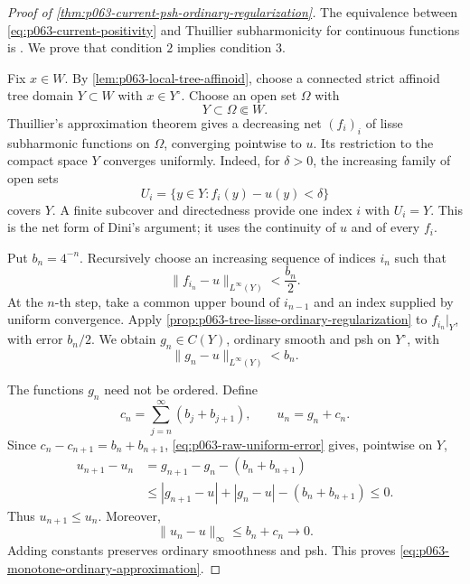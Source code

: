 \begin{proof}[Proof of
\cref{thm:p063-current-psh-ordinary-regularization}]
The equivalence between
\eqref{eq:p063-current-positivity} and Thuillier subharmonicity for
continuous functions is \cite[Corollary~4.8]{Wanner19}.
We prove that condition \(2\) implies condition \(3\).

Fix \(x\in W\).  By \cref{lem:p063-local-tree-affinoid}, choose a connected
strict affinoid tree domain \(Y\subset W\) with \(x\in Y^\circ\).  Choose
an open set \(\Omega\) with
\[
                         Y\subset\Omega\Subset W.
\]
Thuillier's approximation theorem
\cite[Theorem~3.4.2]{Thu05} gives a decreasing net
\((f_i)_i\) of lisse subharmonic functions on \(\Omega\), converging
pointwise to \(u\).  Its restriction to the compact space \(Y\) converges
uniformly.  Indeed, for \(\delta>0\), the increasing family of open sets
\[
                         U_i=\{y\in Y:f_i(y)-u(y)<\delta\}
\]
covers \(Y\).  A finite subcover and directedness provide one index \(i\)
with \(U_i=Y\).  This is the net form of Dini's argument; it uses the
continuity of \(u\) and of every \(f_i\).

Put \(b_n=4^{-n}\).  Recursively choose an increasing sequence of indices
\(i_n\) such that
\[
                         \lVert f_{i_n}-u\rVert_{L^\infty(Y)}
                         <\frac{b_n}{2}.
\]
At the \(n\)-th step, take a common upper bound of \(i_{n-1}\) and an
index supplied by uniform convergence.  Apply
\cref{prop:p063-tree-lisse-ordinary-regularization} to
\(f_{i_n}|_Y\), with error \(b_n/2\).  We obtain \(g_n\in C(Y)\), ordinary
smooth and psh on \(Y^\circ\), with
\begin{equation}
\label{eq:p063-raw-uniform-error}
                         \lVert g_n-u\rVert_{L^\infty(Y)}<b_n.
\end{equation}

The functions \(g_n\) need not be ordered.  Define
\begin{equation}
\label{eq:p063-tail-shift}
                         c_n
   =\sum_{j=n}^{\infty}(b_j+b_{j+1}),
   \qquad
                         u_n=g_n+c_n.
\end{equation}
Since \(c_n-c_{n+1}=b_n+b_{n+1}\),
\eqref{eq:p063-raw-uniform-error} gives, pointwise on \(Y\),
\[
 \begin{aligned}
 u_{n+1}-u_n
   &=
 g_{n+1}-g_n-(b_n+b_{n+1})\\
   &\leq
 |g_{n+1}-u|+|g_n-u|-(b_n+b_{n+1})
 \leq0.
 \end{aligned}
\]
Thus \(u_{n+1}\leq u_n\).  Moreover,
\[
                         \lVert u_n-u\rVert_\infty
                         \leq b_n+c_n\longrightarrow0.
\]
Adding constants preserves ordinary smoothness and psh.  This proves
\eqref{eq:p063-monotone-ordinary-approximation}.


\end{proof}
